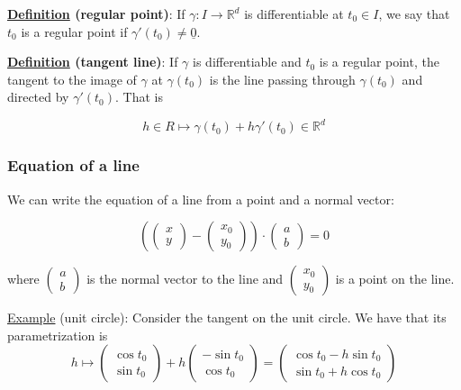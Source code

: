 \documentclass[10pt]{extarticle}
\newcommand{\R}{\mathbb{R}}
\begin{document}
\textbf{\underline{Definition} (regular point)}:
If $\gamma: I \to \R^d$ is differentiable at $t_0 \in I$, we say that $t_0$ is a regular point if $\gamma'(t_0) \neq \underline{0}$.

\textbf{\underline{Definition} (tangent line)}:
If $\gamma$ is differentiable and $t_0$ is a regular point, the tangent to the image of $\gamma$ at $\gamma(t_0)$ is the line passing through $\gamma(t_0)$ and directed by $\gamma'(t_0)$.
That is

$$
    h \in R \mapsto \gamma(t_0) + h \gamma'(t_0) \in \R^d
$$

\subsubsection{Equation of a line}

We can write the equation of a line from a point and a normal vector:

$$
    \left(
    \begin{pmatrix}
            x \\ y
        \end{pmatrix} - \begin{pmatrix}
            x_0 \\ y_0
        \end{pmatrix}
    \right) \cdot \begin{pmatrix}
        a \\ b
    \end{pmatrix} = 0
$$

where $\begin{pmatrix}
        a \\ b
    \end{pmatrix}$ is the normal vector to the line and $\begin{pmatrix}
        x_0 \\ y_0
    \end{pmatrix}$ is a point on the line.


\underline{Example} (unit circle):
Consider the tangent on the unit circle. We have that its parametrization is
$$
    h \mapsto \begin{pmatrix}
        \cos t_0 \\ \sin t_0
    \end{pmatrix} + h \begin{pmatrix}
        -\sin t_0 \\ \cos t_0
    \end{pmatrix} =
    \begin{pmatrix}
        \cos t_0 - h \sin t_0 \\
        \sin t_0 + h \cos t_0
    \end{pmatrix}
$$
\end{document}
